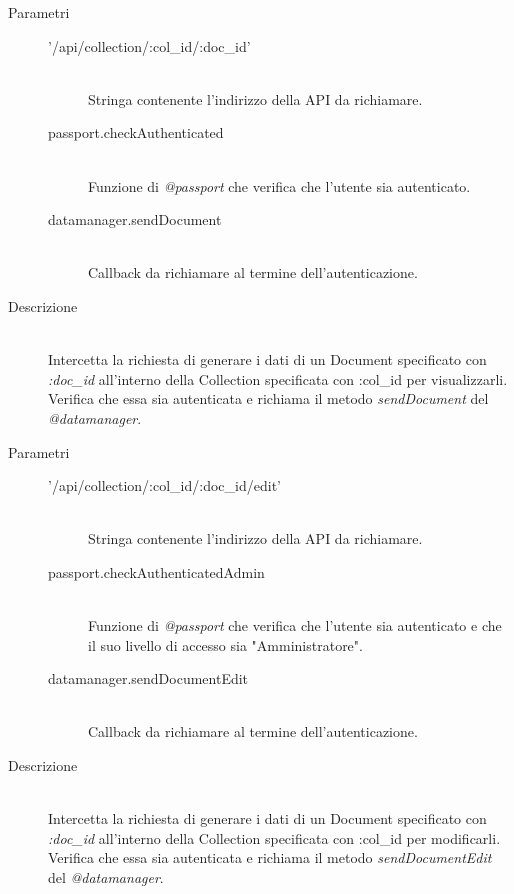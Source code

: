\begin{description}
\begin{description}
\begin{mldescription}
   \hfill 
  \begin{description}
   \item[Parametri] \hfill 
    \begin{description}
     \item['/api/collection/:col\_id/:doc\_id'] \hfill \\
     Stringa contenente l'indirizzo della API da richiamare.
     \item[passport.checkAuthenticated] \hfill \\
     Funzione di \textit{@passport} che verifica che l'utente sia autenticato.
     \item[datamanager.sendDocument] \hfill \\
     Callback da richiamare al termine dell'autenticazione.
     \end{description}
   \item[Descrizione] \hfill \\ 
  Intercetta la richiesta di generare i dati di un Document specificato con \textit{:doc\_id} all'interno della Collection specificata con :col\_id per visualizzarli. Verifica che essa sia autenticata e richiama il metodo \textit{sendDocument} del \textit{@datamanager}.
  \end{description}
  
   \hfill 
  \begin{description}
   \item[Parametri] \hfill 
    \begin{description}
     \item['/api/collection/:col\_id/:doc\_id/edit'] \hfill \\
     Stringa contenente l'indirizzo della API da richiamare.
     \item[passport.checkAuthenticatedAdmin] \hfill \\
     Funzione di \textit{@passport} che verifica che l'utente sia autenticato e che il suo livello di accesso sia "Amministratore".
     \item[datamanager.sendDocumentEdit] \hfill \\
     Callback da richiamare al termine dell'autenticazione.
     \end{description}
   \item[Descrizione] \hfill \\ 
  Intercetta la richiesta di generare i dati di un Document specificato con \textit{:doc\_id} all'interno della Collection specificata con :col\_id per modificarli. Verifica che essa sia autenticata e richiama il metodo \textit{sendDocumentEdit} del \textit{@datamanager}.
  \end{description}
  

\end{mldescription}
\end{description}
\end{description}
